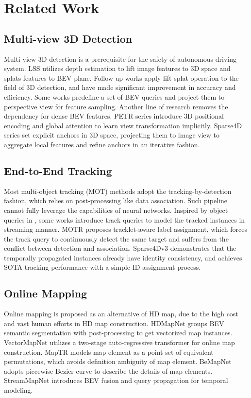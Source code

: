 \section{Related Work}
\subsection{Multi-view 3D Detection}
Multi-view 3D detection is a prerequisite for the safety of autonomous driving system. LSS\cite{lss} utilizes depth estimation to lift image features to 3D space and splats features to BEV plane. Follow-up works apply lift-splat operation to the field of 3D detection, and have made significant improvement in accuracy\cite{bevdet, bevdet4d, bevdepth, bevstereo} and efficiency\cite{bevfusion, bevpoolv2}. Some works\cite{bevformer, bevformerv2, polarformer, gkt} predefine a set of BEV queries and project them to perspective view for feature sampling. Another line of research removes the dependency for dense BEV features. PETR series\cite{petr, petrv2, streampetr} introduce 3D positional encoding and global attention to learn view transformation implicitly. Sparse4D series\cite{sparse4d, sparse4dv2, sparse4dv3} set explicit anchors in 3D space, projecting them to image view to aggregate local features and refine anchors in an iterative fashion.

\subsection{End-to-End Tracking}
Most multi-object tracking (MOT) methods adopt the tracking-by-detection fashion, which relies on post-processing like data association. Such pipeline cannot fully leverage the capabilities of neural networks. Inspired by object queries in \cite{detr}, some works\cite{motr, motrv2, motrv3, trackformer, transtrack, mutr3d} introduce track queries to model the tracked instances in streaming manner. MOTR\cite{motr} proposes tracklet-aware label assignment, which forces the track query to continuously detect the same target and suffers from the conflict between detection and association\cite{motrv2, motrv3}. Sparse4Dv3 demonstrates that the temporally propagated instances already have identity consistency, and achieves SOTA tracking performance with a simple ID assignment process.

\subsection{Online Mapping}
Online mapping is proposed as an alternative of HD map, due to the high cost and vast human efforts in HD map construction. HDMapNet\cite{hdmapnet} groups BEV semantic segmentation with post-processing to get vectorized map instances. VectorMapNet\cite{vectormapnet} utilizes a two-stage auto-regressive transformer for online map construction. MapTR\cite{maptr} models map element as a point set of equivalent permutations, which avoids definition ambiguity of map element. BeMapNet adopts piecewise Bezier curve to describe the details of map elements. StreamMapNet\cite{streammapnet} introduces BEV fusion and query propagation for temporal modeling.

